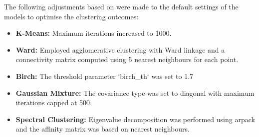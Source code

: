 The following adjustments based on \citet{Scikit-learn_undated-ax} were made to the default settings of the models to optimise the clustering outcomes:
\begin{itemize}
    \item \textbf{K-Means:} Maximum iterations increased to 1000.
    \item \textbf{Ward:} Employed agglomerative clustering with Ward linkage and a connectivity matrix computed using 5 nearest neighbours for each point.
    \item \textbf{Birch:} The threshold parameter `birch\_th` was set to 1.7
    \item \textbf{Gaussian Mixture:} The covariance type was set to diagonal with maximum iterations capped at 500.
    \item \textbf{Spectral Clustering:} Eigenvalue decomposition was performed using arpack and the affinity matrix was based on nearest neighbours.
\end{itemize}

